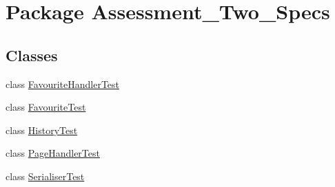 \hypertarget{namespace_assessment___two___specs}{
\section{Package Assessment\_\-Two\_\-Specs}
\label{namespace_assessment___two___specs}
}
\subsection*{Classes}
\begin{DoxyCompactItemize}
\item 
class \hyperlink{class_assessment___two___specs_1_1_favourite_handler_test}{FavouriteHandlerTest}
\item 
class \hyperlink{class_assessment___two___specs_1_1_favourite_test}{FavouriteTest}
\item 
class \hyperlink{class_assessment___two___specs_1_1_history_test}{HistoryTest}
\item 
class \hyperlink{class_assessment___two___specs_1_1_page_handler_test}{PageHandlerTest}
\item 
class \hyperlink{class_assessment___two___specs_1_1_serialiser_test}{SerialiserTest}
\end{DoxyCompactItemize}
